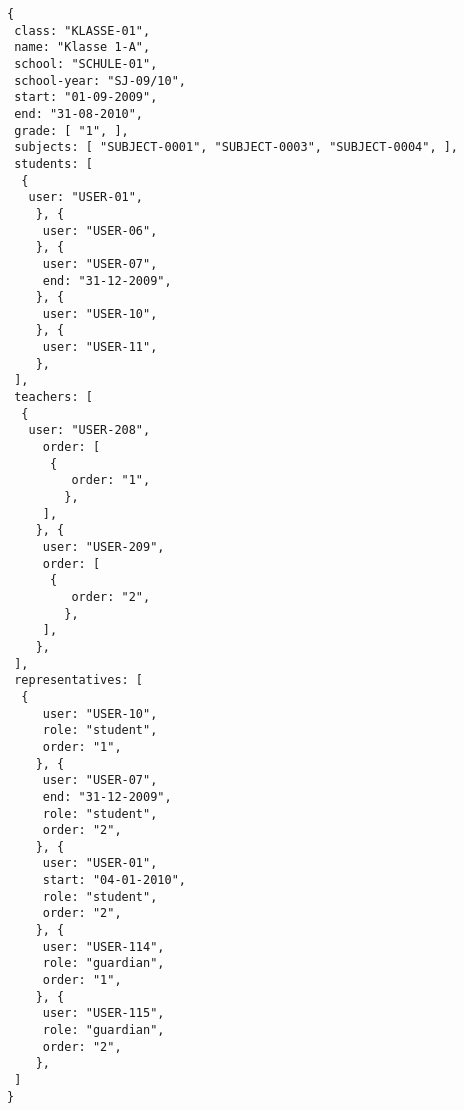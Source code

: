 
\begin{lstlisting}[caption={Klassen-Datenmodell
 Beispiel 2: Grundschulklasse},frame=tlrb]
{
 class: "KLASSE-01",
 name: "Klasse 1-A",
 school: "SCHULE-01",
 school-year: "SJ-09/10",
 start: "01-09-2009",
 end: "31-08-2010",
 grade: [ "1", ],
 subjects: [ "SUBJECT-0001", "SUBJECT-0003", "SUBJECT-0004", ],
 students: [
  { 
   user: "USER-01",
	}, { 
	 user: "USER-06",
	}, { 
	 user: "USER-07",
	 end: "31-12-2009",
	}, { 
	 user: "USER-10",
	}, { 
	 user: "USER-11",
	},
 ],
 teachers: [
  { 
   user: "USER-208",
	 order: [
	  {
		 order: "1",
		},
	 ],
	}, { 
	 user: "USER-209",
	 order: [
	  {
		 order: "2",
		},
	 ],
	},
 ],
 representatives: [
  {
	 user: "USER-10",
	 role: "student",
	 order: "1",	 
	}, {
	 user: "USER-07",
	 end: "31-12-2009",
	 role: "student",
	 order: "2",	 
	}, {
	 user: "USER-01",
	 start: "04-01-2010",
	 role: "student",
	 order: "2",	 
	}, {
	 user: "USER-114",
	 role: "guardian",
	 order: "1",	 
	}, {
	 user: "USER-115",
	 role: "guardian",
	 order: "2",	 
	},  
 ]
}
\end{lstlisting}